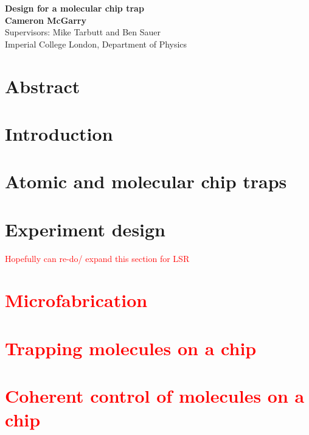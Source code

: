 \documentclass[
 aps,
 a4paper,
 showpacs,
 superscriptaddress,
 notitlepage,
 nofootinbib,
 preprint %
]{revtex4-1}
\newcommand{\thesis}[1]{\textcolor{red}{#1}} %
\begin{document}

\begin{titlepage}
  \begin{center}
    \vspace*{1cm}
      \textbf{Design for a molecular chip trap} \\
    \vspace{1.5cm}
      \textbf{Cameron McGarry} \\
    \vspace{0.5cm}
       Supervisors: Mike Tarbutt and Ben Sauer \\
    \vspace{0.5cm}
       {Imperial College London, Department of Physics} \\
  \end{center}
\end{titlepage}

\section*{Abstract}

\clearpage

\tableofcontents
\clearpage

\setcounter{page}{4} 


\section{Introduction}


\section{Atomic and molecular chip traps}
\label{chiptraps}


\section{Experiment design}
\thesis{Hopefully can re-do/ expand this section for LSR}
\label{experiment}


\thesis{
\section{Microfabrication} %
\section{Trapping molecules on a chip}
\section{Coherent control of molecules on a chip}
}
\end{document}
